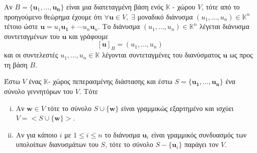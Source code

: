 \begin{rem}
  Αν $B = \{ \mathbf{u}_{1}, \ldots, \mathbf{u_{n}} \} $ είναι μια διατεταγμένη 
  βάση ενός $ \mathbb{K} $ - χώρου $V$, τότε από το προηγούμενο θεώρημα έχουμε ότι 
  $ \forall \mathbf{u} \in V, \; \exists $ μοναδικό διάνυσμα 
  $ (u_{1}, \ldots, u_{n}) \in \mathbb{K}^{n} $ τέτοιο ώστε 
  $ \mathbf{u} = u_{1} \mathbf{u_{1}} + \cdots u_{n} \mathbf{u}_{n} $. 
  Το διάνυσμα $ (u_{1}, \ldots, u_{n}) \in \mathbb{K}^{n} $ λέγεται 
  \textcolor{Col2}{διάνυσμα συντεταγμένων} του $ \mathbf{u} $ και γράφουμε 
  \[ 
    [\mathbf{u}]_{B} = (u_{1}, \ldots, u_{n})
\] 
και  
οι συντελεστές $ u_{1}, \ldots, u_{n} \in \mathbb{K} $ λέγονται 
\textcolor{Col2}{συντεταγμένες} του διανύσματος $ \mathbf{u} $ ως προς τη βάση $B$.
\end{rem}

\begin{lem}
  Έστω $V$ ένας $ \mathbb{K} $- χώρος πεπερασμένης διάστασης και έστω 
  $ S = \{ \mathbf{u_{1}}, \ldots, \mathbf{u_{n}} \} $ ένα σύνολο γεννητόρων του 
  $V$. Τότε 
  \begin{enumerate}[i)]
    \item Αν $ \mathbf{w} \in V $ τότε το σύνολο $ S \cup \{ \mathbf{w} \} $ είναι 
      γραμμικώς εξαρτημένο και ισχύει $ V = < S \cup \{ \mathbf{w} \} >  $.
    \item Αν για κάποιο $ i $ με $ 1 \leq i \leq n $ το διάνυσμα 
      $ \mathbf{u}_{i} $ είναι γραμμικός συνδυασμός των υπολοίπων διανυσμάτων 
      του $S$, τότε το σύνολο $ S - \{ \mathbf{u}_{i} \} $ παράγει τον $V$. 
  \end{enumerate}
\end{lem}
